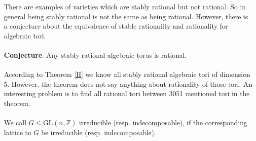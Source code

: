 \documentclass{article}
\theoremstyle{plain}
\theoremstyle{definition}
\newcommand{\Z}{\ensuremath{\mathbb{Z}}}
\newcommand{\Q}{\ensuremath{\mathbb{Q}}}
\newcommand{\G}{G}
\begin{document}
 \noindent
There are examples of varieties which are stably rational but not rational. So in general being stably rational is not the same as being rational. However, there is a conjecture about the equivalence of stable rationality and rationality for algebraic tori.\\ \\
 \textbf{Conjecture}. \cite[Section 2.6.1]{Voskresenskii} Any stably rational algebraic torus is rational.\\
 \\
% 
According to Theorem \ref{H} we know all stably rational algebraic tori of dimension 5. However, the theorem does not say anything about rationality of those tori. An interesting problem is to find all rational tori between 3051 mentioned tori in the theorem.\\
\\
We call $\G \leq \mathrm{GL}(n,\Z)$ irreducible (resp. indecomposable), if the corresponding lattice to $G$ be irreducible (resp. indecomposable).
\\
 
\end{document}
